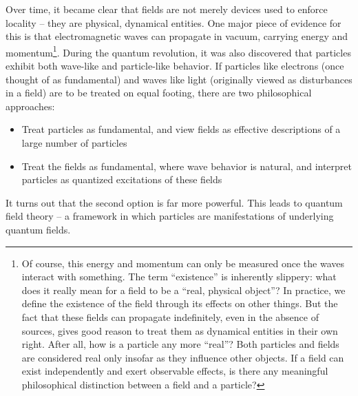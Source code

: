 \noindent Over time, it became clear that fields are not merely devices used to enforce locality -- they are physical, dynamical entities. One major piece of evidence for this is that electromagnetic waves can propagate in vacuum, carrying energy and momentum\footnote[2]{Of course, this energy and momentum can only be measured once the waves interact with something. The term “existence” is inherently slippery: what does it really mean for a field to be a “real, physical object”? In practice, we define the existence of the field through its effects on other things. But the fact that these fields can propagate indefinitely, even in the absence of sources, gives good reason to treat them as dynamical entities in their own right. After all, how is a particle any more “real”? Both particles and fields are considered real only insofar as they influence other objects. If a field can exist independently and exert observable effects, is there any meaningful philosophical distinction between a field and a particle?}. During the quantum revolution, it was also discovered that particles exhibit both wave-like and particle-like behavior. If particles like electrons (once thought of as fundamental) and waves like light (originally viewed as disturbances in a field) are to be treated on equal footing, there are two philosophical approaches: 
\begin{itemize}
    \item Treat particles as fundamental, and view fields as effective descriptions of a large number of particles
    \item Treat the fields as fundamental, where wave behavior is natural, and interpret particles as quantized excitations of these fields
\end{itemize}
It turns out that the second option is far more powerful. This leads to quantum field theory -- a framework in which particles are manifestations of underlying quantum fields.